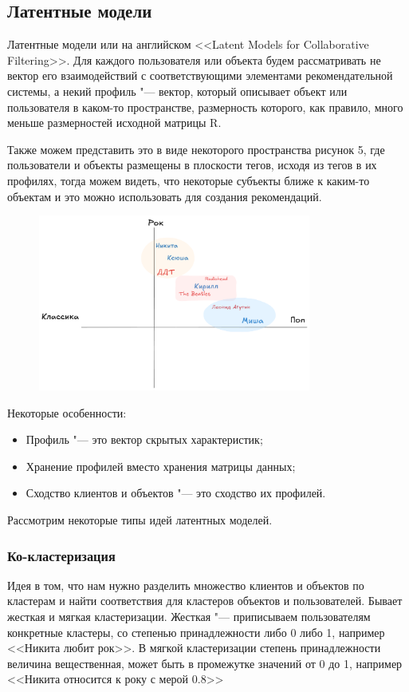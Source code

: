 \documentclass[referat]{SCWorks}
\begin{document}
\subsection{Латентные модели}
Латентные модели или на английском <<Latent Models for Collaborative Filtering>>.
Для каждого пользователя или объекта будем рассматривать не вектор
его взаимодействий с соответствующими элементами рекомендательной системы, 
а некий профиль "--- вектор, который описывает объект
или пользователя в каком-то пространстве, размерность которого, как правило, 
много меньше размерностей исходной матрицы R.

Также можем представить это в виде некоторого пространства рисунок 5, где пользователи
и объекты размещены в плоскости тегов, исходя из тегов в их профилях, тогда можем видеть, что 
некоторые субъекты ближе к каким-то объектам и это можно использовать для создания рекомендаций.

\begin{figure}[H]
  \centering
  \includegraphics[width=0.8\textwidth]{./7.png}
  \caption{}
\end{figure}


Некоторые особенности:
\begin{itemize}
  \item Профиль "--- это вектор скрытых характеристик;
  \item Хранение профилей вместо хранения матрицы данных;
  \item Сходство клиентов и объектов "--- это сходство их профилей.
\end{itemize}
Рассмотрим некоторые типы идей латентных моделей.

\subsubsection{Ко-кластеризация}
Идея в том, что нам нужно разделить множество клиентов и объектов по кластерам и найти соответствия для
кластеров объектов и пользователей.
Бывает жесткая и мягкая кластеризации. Жесткая "--- приписываем пользователям конкретные кластеры, со степенью принадлежности либо 0 либо 1, например <<Никита любит рок>>.
В мягкой кластеризации степень принадлежности величина вещественная, может быть в промежутке значений от 0 до 1, например <<Никита относится к року с мерой 0.8>>
\end{document}
